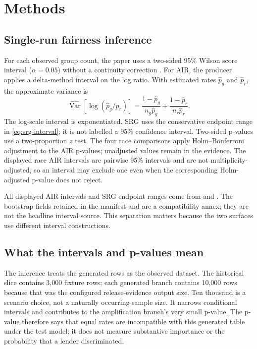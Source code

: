 \section{Methods}

\subsection{Single-run fairness inference}

For each observed group count, the paper uses a two-sided 95\% Wilson score interval
($\alpha=0.05$) without a continuity correction \citep{brown2001interval}. For AIR, the producer applies a delta-method
interval on the log ratio. With estimated rates $\widehat p_g$ and $\widehat p_r$, the approximate
variance is
\begin{equation}
  \widehat{\operatorname{Var}}\!\left[\log(\widehat p_g/\widehat p_r)\right]
  = \frac{1-\widehat p_g}{n_g\widehat p_g}
  + \frac{1-\widehat p_r}{n_r\widehat p_r}.
  \label{eq:air-delta}
\end{equation}
The log-scale interval is exponentiated. SRG uses the conservative endpoint range in
\autoref{eq:srg-interval}; it is not labelled a 95\% confidence interval. Two-sided p-values use a
two-proportion $z$ test. The four race comparisons apply Holm--Bonferroni adjustment to the AIR
p-values; unadjusted values remain in the evidence. The displayed race AIR intervals are pairwise
95\% intervals and are not multiplicity-adjusted, so an interval may exclude one even when the
corresponding Holm-adjusted p-value does not reject.

All displayed AIR intervals and SRG endpoint ranges come from
 and . The bootstrap fields
retained in the manifest and
 are a compatibility annex; they are not the headline interval
source. This separation matters because the two surfaces use different interval constructions.

\subsection{What the intervals and p-values mean}

The inference treats the generated rows as the observed dataset. The historical slice contains
3,000 fixture rows; each generated branch contains 10,000 rows because that was the configured
release-evidence output size. Ten thousand is a scenario choice, not a naturally occurring sample
size. It narrows conditional intervals and contributes to the amplification branch's very small
p-value. The p-value therefore says that equal rates are incompatible with this generated table
under the test model; it does not measure substantive importance or the probability that a lender
discriminated.

